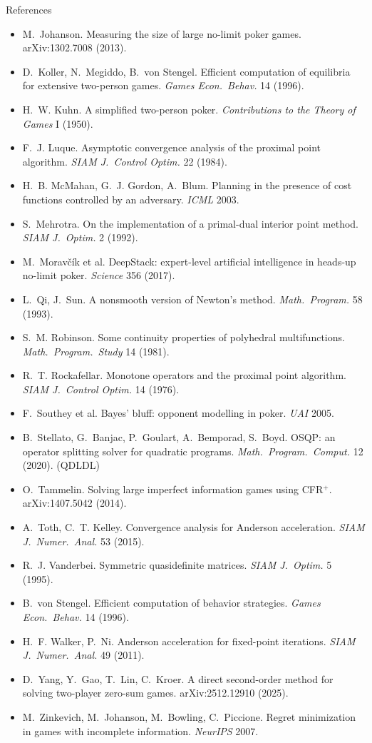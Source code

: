 \documentclass[10pt,aspectratio=169]{beamer}
\begin{document}
\begin{frame}[allowframebreaks]{References}
\begin{itemize}
\item M.~Johanson. Measuring the size of large no-limit poker games. arXiv:1302.7008 (2013).
\item D.~Koller, N.~Megiddo, B.~von Stengel. Efficient computation of equilibria for extensive two-person games. \emph{Games Econ.\ Behav.} 14 (1996).
\item H.~W. Kuhn. A simplified two-person poker. \emph{Contributions to the Theory of Games} I (1950).
\item F.~J. Luque. Asymptotic convergence analysis of the proximal point algorithm. \emph{SIAM J.\ Control Optim.} 22 (1984).
\item H.~B. McMahan, G.~J. Gordon, A.~Blum. Planning in the presence of cost functions controlled by an adversary. \emph{ICML} 2003.
\item S.~Mehrotra. On the implementation of a primal-dual interior point method. \emph{SIAM J.\ Optim.} 2 (1992).
\item M.~Morav\v{c}\'ik et al. DeepStack: expert-level artificial intelligence in heads-up no-limit poker. \emph{Science} 356 (2017).
\item L.~Qi, J.~Sun. A nonsmooth version of Newton's method. \emph{Math.\ Program.} 58 (1993).
\item S.~M. Robinson. Some continuity properties of polyhedral multifunctions. \emph{Math.\ Program.\ Study} 14 (1981).
\item R.~T. Rockafellar. Monotone operators and the proximal point algorithm. \emph{SIAM J.\ Control Optim.} 14 (1976).
\item F.~Southey et al. Bayes' bluff: opponent modelling in poker. \emph{UAI} 2005.
\item B.~Stellato, G.~Banjac, P.~Goulart, A.~Bemporad, S.~Boyd. OSQP: an operator splitting solver for quadratic programs. \emph{Math.\ Program.\ Comput.} 12 (2020). (QDLDL)
\item O.~Tammelin. Solving large imperfect information games using CFR$^+$. arXiv:1407.5042 (2014).
\item A.~Toth, C.~T. Kelley. Convergence analysis for Anderson acceleration. \emph{SIAM J.\ Numer.\ Anal.} 53 (2015).
\item R.~J. Vanderbei. Symmetric quasidefinite matrices. \emph{SIAM J.\ Optim.} 5 (1995).
\item B.~von Stengel. Efficient computation of behavior strategies. \emph{Games Econ.\ Behav.} 14 (1996).
\item H.~F. Walker, P.~Ni. Anderson acceleration for fixed-point iterations. \emph{SIAM J.\ Numer.\ Anal.} 49 (2011).
\item D.~Yang, Y.~Gao, T.~Lin, C.~Kroer. A direct second-order method for solving two-player zero-sum games. arXiv:2512.12910 (2025).
\item M.~Zinkevich, M.~Johanson, M.~Bowling, C.~Piccione. Regret minimization in games with incomplete information. \emph{NeurIPS} 2007.
\end{itemize}
\end{frame}
\end{document}
